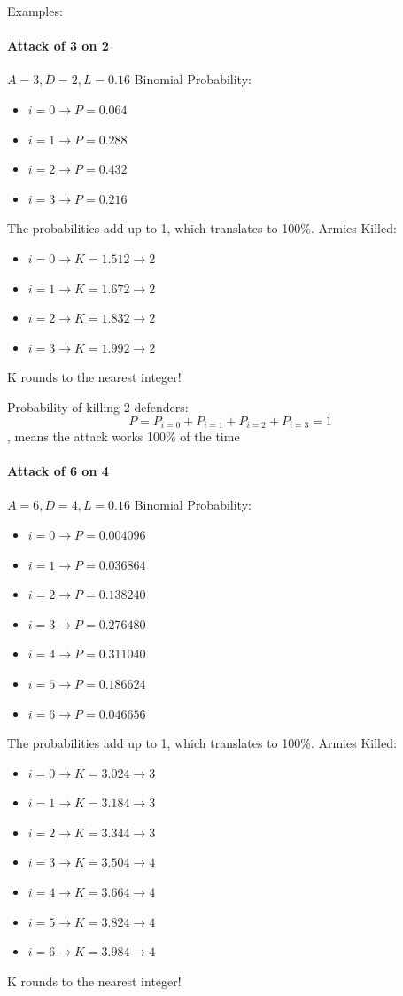 Examples:

\paragraph{Attack of 3 on 2}

$A=3, D=2, L=0.16$
Binomial Probability:
\begin{itemize}
    \item $i=0 \rightarrow P=0.064$
    \item $i=1 \rightarrow P=0.288$
    \item $i=2 \rightarrow P=0.432$
    \item $i=3 \rightarrow P=0.216$
\end{itemize}
The probabilities add up to 1, which translates to 100\%.
Armies Killed:
\begin{itemize}
    \item $i=0 \rightarrow K=1.512 \rightarrow 2$
    \item $i=1 \rightarrow K=1.672 \rightarrow 2$
    \item $i=2 \rightarrow K=1.832 \rightarrow 2$
    \item $i=3 \rightarrow K=1.992 \rightarrow 2$
\end{itemize}
K rounds to the nearest integer!

Probability of killing 2 defenders: 
$$P = P_{i=0} + P_{i=1} + P_{i=2} + P_{i=3} = 1$$
, means the attack works 100\% of the time

\paragraph{Attack of 6 on 4}

$A=6, D=4, L=0.16$
Binomial Probability:
\begin{itemize}
    \item $i=0 \rightarrow P=0.004096$
    \item $i=1 \rightarrow P=0.036864$
    \item $i=2 \rightarrow P=0.138240$
    \item $i=3 \rightarrow P=0.276480$
    \item $i=4 \rightarrow P=0.311040$
    \item $i=5 \rightarrow P=0.186624$
    \item $i=6 \rightarrow P=0.046656$
\end{itemize}
The probabilities add up to 1, which translates to 100\%.
Armies Killed:
\begin{itemize}
    \item $i=0 \rightarrow K=3.024 \rightarrow 3$
    \item $i=1 \rightarrow K=3.184 \rightarrow 3$
    \item $i=2 \rightarrow K=3.344 \rightarrow 3$
    \item $i=3 \rightarrow K=3.504 \rightarrow 4$
    \item $i=4 \rightarrow K=3.664 \rightarrow 4$
    \item $i=5 \rightarrow K=3.824 \rightarrow 4$
    \item $i=6 \rightarrow K=3.984 \rightarrow 4$
\end{itemize}
K rounds to the nearest integer!

